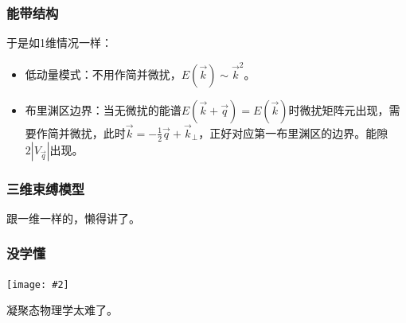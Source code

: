 \documentclass[CJK]{beamer}
\newcommand{\cpic}[2]{
\begin{center}
\texttt{[image: \#2]}
\end{center}
}
\begin{document}
\begin{frame}
\frametitle{\bch 能带结构 \ech}
\bch
于是如1维情况一样：
\begin{itemize}
\item 低动量模式：不用作简并微扰，$E(\vec k) \sim \vec{k}^2$。
\item 布里渊区边界：当无微扰的能谱$E(\vec k + \vec q) = E(\vec k)$时微扰矩阵元出现，需要作简并微扰，此时$\vec k = - \frac{1}{2} \vec q + \vec{k}_\perp$，正好对应第一布里渊区的边界。能隙$2|V_{\vec q} |$出现。
\end{itemize}
\ech
\end{frame}


\begin{frame}
\frametitle{\bch 三维束缚模型 \ech}
\bch
跟一维一样的，懒得讲了。
\ech
\end{frame}

\begin{frame}
\frametitle{\bch 没学懂 \ech}
\bch
\cpic{0.3}{not_understand}
凝聚态物理学太难了。
\ech
\end{frame}
\end{document}
